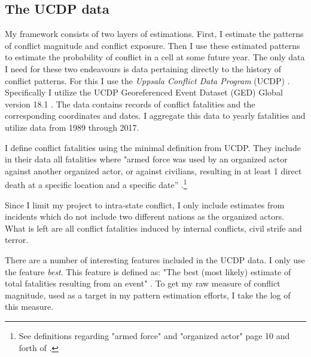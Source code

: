 \documentclass[a4paper]{article}
\begin{document}
\subsection{The UCDP data}



My framework consists of two layers of estimations. First, I estimate the patterns of conflict magnitude and conflict exposure. Then I use these estimated patterns to estimate the probability of conflict in a cell at some future year. The only data I need for these two endeavours is data pertaining directly to the history of conflict patterns. For this I use the \emph{Uppsala Conflict Data Program} (UCDP) \citep{Sundberg_2013, Croicu_Sundberg_2017}. Specifically I utilize the UCDP Georeferenced Event Dataset (GED) Global version 18.1 \citep{UCDP_2017}. The data contains records of conflict fatalities and the corresponding coordinates and dates. I aggregate this data to yearly fatalities and utilize data from 1989 through 2017.\par 

I define conflict fatalities using the minimal definition from UCDP. They include in their data all fatalities where "armed force was used by an organized actor against another organized actor, or against civilians, resulting in at least 1 direct death at a specific location and a specific date” \cite[9]{Croicu_Sundberg_2017}.\footnote{See definitions regarding "armed force" and "organized actor" page 10 and forth of \cite{Croicu_Sundberg_2017}.}\par 

Since I limit my project to intra-state conflict, I only include estimates from incidents which do not include two different nations as the organized actors. What is left are all conflict fatalities induced by internal conflicts, civil strife and terror.\par

There are a number of interesting features included in the UCDP data. I only use the feature \emph{best}. This feature is defined as: "The best (most likely) estimate of total fatalities resulting from an event" \cite[7]{Croicu_Sundberg_2017}. To get my raw measure of conflict magnitude, used as a target in my pattern estimation efforts, I take the log of this measure.\par
\end{document}
